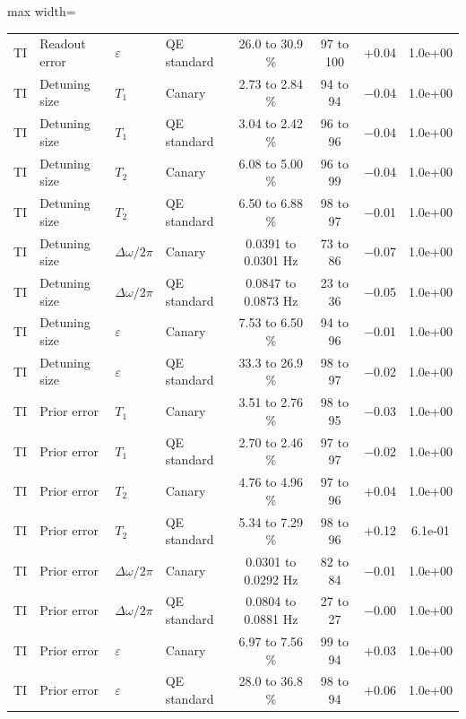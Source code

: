 \begin{table}[!t]
\begin{adjustbox}{max width=\linewidth}
\begin{tabular}{llllcccc}
TI & Readout error & $\varepsilon$ & QE standard & 26.0 to 30.9 \% & 97 to 100 & +0.04 & 1.0e+00 \\
TI & Detuning size & $T_1$ & Canary & 2.73 to 2.84 \% & 94 to 94 & $-$0.04 & 1.0e+00 \\
TI & Detuning size & $T_1$ & QE standard & 3.04 to 2.42 \% & 96 to 96 & $-$0.04 & 1.0e+00 \\
TI & Detuning size & $T_2$ & Canary & 6.08 to 5.00 \% & 96 to 99 & $-$0.04 & 1.0e+00 \\
TI & Detuning size & $T_2$ & QE standard & 6.50 to 6.88 \% & 98 to 97 & $-$0.01 & 1.0e+00 \\
TI & Detuning size & $\Delta\omega/2\pi$ & Canary & 0.0391 to 0.0301 Hz & 73 to 86 & $-$0.07 & 1.0e+00 \\
TI & Detuning size & $\Delta\omega/2\pi$ & QE standard & 0.0847 to 0.0873 Hz & 23 to 36 & $-$0.05 & 1.0e+00 \\
TI & Detuning size & $\varepsilon$ & Canary & 7.53 to 6.50 \% & 94 to 96 & $-$0.01 & 1.0e+00 \\
TI & Detuning size & $\varepsilon$ & QE standard & 33.3 to 26.9 \% & 98 to 97 & $-$0.02 & 1.0e+00 \\
TI & Prior error & $T_1$ & Canary & 3.51 to 2.76 \% & 98 to 95 & $-$0.03 & 1.0e+00 \\
TI & Prior error & $T_1$ & QE standard & 2.70 to 2.46 \% & 97 to 97 & $-$0.02 & 1.0e+00 \\
TI & Prior error & $T_2$ & Canary & 4.76 to 4.96 \% & 97 to 96 & +0.04 & 1.0e+00 \\
TI & Prior error & $T_2$ & QE standard & 5.34 to 7.29 \% & 98 to 96 & +0.12 & 6.1e-01 \\
TI & Prior error & $\Delta\omega/2\pi$ & Canary & 0.0301 to 0.0292 Hz & 82 to 84 & $-$0.01 & 1.0e+00 \\
TI & Prior error & $\Delta\omega/2\pi$ & QE standard & 0.0804 to 0.0881 Hz & 27 to 27 & $-$0.00 & 1.0e+00 \\
TI & Prior error & $\varepsilon$ & Canary & 6.97 to 7.56 \% & 99 to 94 & +0.03 & 1.0e+00 \\
TI & Prior error & $\varepsilon$ & QE standard & 28.0 to 36.8 \% & 98 to 94 & +0.06 & 1.0e+00 \\
\hline
\end{tabular}
\end{adjustbox}
\end{table}
